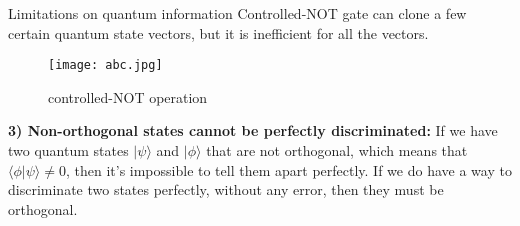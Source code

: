 \documentclass[12pt, aspectratio=169]{beamer}
\begin{document}
\begin{frame}{Limitations on quantum information}
Controlled-NOT gate can clone a few certain quantum state vectors, but it is inefficient for all the vectors. 
\begin{figure}[h]
    \centering
    \texttt{[image: abc.jpg]}
    \caption{controlled-NOT operation}
    \label{fig:controlled-NOT operation}
\end{figure}
\textbf{3) Non-orthogonal states cannot be perfectly discriminated:} If we have two quantum states \(\vert \psi \rangle\) and \(\vert \phi \rangle\) that are not orthogonal, which means that \(\langle \phi \vert \psi \rangle \neq 0\), then it's impossible to tell them apart perfectly. If we do have a way to discriminate two states perfectly, without any error, then they must be orthogonal.

\end{frame}
\end{document}
